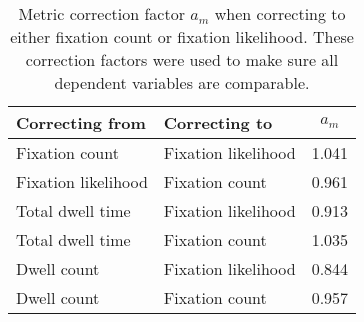 \begin{table}[ht]
\centering
\caption{Metric correction factor $a_m$ when correcting to either fixation count or fixation likelihood. These correction factors were used to make sure all dependent variables are comparable.} 
\label{tab:metric_correction}
\begin{tabular}{llc}
  \hline
Correcting from & Correcting to & $a_m$ \\ 
  \hline
Fixation count & Fixation likelihood & 1.041 \\ 
  Fixation likelihood & Fixation count & 0.961 \\ 
  Total dwell time & Fixation likelihood & 0.913 \\ 
  Total dwell time & Fixation count & 1.035 \\ 
  Dwell count & Fixation likelihood & 0.844 \\ 
  Dwell count & Fixation count & 0.957 \\ 
   \hline
\end{tabular}
\end{table}

